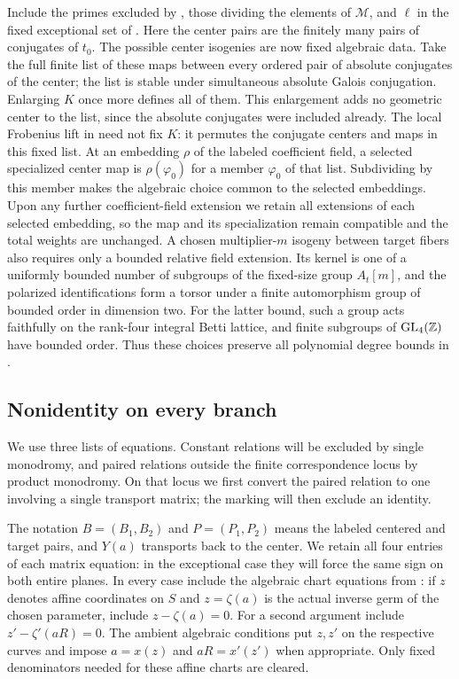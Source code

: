 Include the primes excluded by , those
dividing the elements of $\mathcal M$, and $\ell$ in the fixed exceptional
set of .  Here the center pairs are the finitely
many pairs of conjugates of $t_0$.  The possible center isogenies are now
fixed algebraic data.  Take the full finite list of these maps between
every ordered pair of absolute conjugates of the center; the list is
stable under simultaneous absolute Galois conjugation.  Enlarging $K$
once more defines all of them.  This enlargement adds no geometric
center to the list, since the absolute conjugates were included already.
The local Frobenius lift in  need not fix
$K$: it permutes the conjugate centers and maps in this fixed list.
At an embedding $\rho$ of the labeled coefficient field, a selected
specialized center map is $\rho(\varphi_0)$ for a member $\varphi_0$
of that list.  Subdividing by this member makes the algebraic choice
common to the selected embeddings.  Upon any further coefficient-field
extension we retain all extensions of each selected embedding, so
the map and its specialization remain compatible and the total weights
are unchanged.  A
chosen multiplier-$m$ isogeny between target fibers also requires only a
bounded relative field extension.  Its kernel is one of a uniformly
bounded number of subgroups of the fixed-size group $A_t[m]$, and the
polarized identifications form a torsor under a finite automorphism group
of bounded order in dimension two.  For the latter bound, such a group
acts faithfully on the rank-four integral Betti lattice, and finite
subgroups of $\operatorname{GL}_4(\mathbb Z)$ have bounded order.  Thus these
choices preserve all
polynomial degree bounds in .

\subsection{Nonidentity on every branch}

We use three lists of equations.  Constant relations will be excluded
by single monodromy, and paired relations outside the finite
correspondence locus by product monodromy.  On that locus we first
convert the paired relation to one involving a single transport
matrix; the marking will then exclude an identity.

The notation $B=(B_1,B_2)$ and $P=(P_1,P_2)$ means the labeled centered
and target pairs, and $Y(a)$ transports back to the center.  We retain
all four entries of each matrix equation: in the exceptional case they
will force the same sign on both entire planes.  In every case include
the algebraic chart equations from
: if $z$ denotes affine coordinates on $S$ and
$z=\zeta(a)$ is the actual inverse germ of the chosen parameter, include
$z-\zeta(a)=0$.  For a second argument include
$z'-\zeta'(aR)=0$.  The ambient algebraic conditions put $z,z'$ on the
respective curves and impose $a=x(z)$ and $aR=x'(z')$ when appropriate.
Only fixed denominators needed for these affine charts are cleared.

